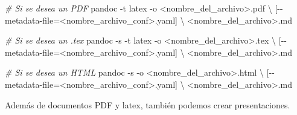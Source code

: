 \documentclass[
]{article}
\newenvironment{Shaded}{}{}
\newcommand{\AttributeTok}[1]{\textcolor[rgb]{0.49,0.56,0.16}{#1}}
\newcommand{\CommentTok}[1]{\textcolor[rgb]{0.38,0.63,0.69}{\textit{#1}}}
\newcommand{\DataTypeTok}[1]{\textcolor[rgb]{0.56,0.13,0.00}{#1}}
\newcommand{\ExtensionTok}[1]{#1}
\newcommand{\NormalTok}[1]{#1}
\newcommand{\OperatorTok}[1]{\textcolor[rgb]{0.40,0.40,0.40}{#1}}
\begin{document}
\begin{Shaded}
\begin{Highlighting}[]
\CommentTok{\# Si se desea un PDF}
\ExtensionTok{pandoc} \AttributeTok{{-}t}\NormalTok{ latex }\AttributeTok{{-}o} \OperatorTok{\textless{}}\NormalTok{nombre\_del\_archivo}\OperatorTok{\textgreater{}}\NormalTok{.pdf }\DataTypeTok{\textbackslash{}}
\NormalTok{    [{-}{-}metadata{-}file=}\OperatorTok{\textless{}}\NormalTok{nombre\_archivo\_conf}\OperatorTok{\textgreater{}}\NormalTok{.yaml] }\DataTypeTok{\textbackslash{}}
    \OperatorTok{\textless{}}\NormalTok{nombre\_del\_archivo}\OperatorTok{\textgreater{}}\NormalTok{.md}

\CommentTok{\# Si se desea un .tex  }
\ExtensionTok{pandoc} \AttributeTok{{-}s} \AttributeTok{{-}t}\NormalTok{ latex }\AttributeTok{{-}o} \OperatorTok{\textless{}}\NormalTok{nombre\_del\_archivo}\OperatorTok{\textgreater{}}\NormalTok{.tex }\DataTypeTok{\textbackslash{}}
\NormalTok{    [{-}{-}metadata{-}file=}\OperatorTok{\textless{}}\NormalTok{nombre\_archivo\_conf}\OperatorTok{\textgreater{}}\NormalTok{.yaml] }\DataTypeTok{\textbackslash{}}
    \OperatorTok{\textless{}}\NormalTok{nombre\_del\_archivo}\OperatorTok{\textgreater{}}\NormalTok{.md}
\end{Highlighting}
\end{Shaded}

\begin{Shaded}
\begin{Highlighting}[]
\CommentTok{\# Si se desea un HTML}
\ExtensionTok{pandoc} \AttributeTok{{-}s} \AttributeTok{{-}o} \OperatorTok{\textless{}}\NormalTok{nombre\_del\_archivo}\OperatorTok{\textgreater{}}\NormalTok{.html }\DataTypeTok{\textbackslash{}}
\NormalTok{    [{-}{-}metadata{-}file=}\OperatorTok{\textless{}}\NormalTok{nombre\_archivo\_conf}\OperatorTok{\textgreater{}}\NormalTok{.yaml] }\DataTypeTok{\textbackslash{}}
    \OperatorTok{\textless{}}\NormalTok{nombre\_del\_archivo}\OperatorTok{\textgreater{}}\NormalTok{.md}
\end{Highlighting}
\end{Shaded}

Además de documentos PDF y latex, también podemos crear presentaciones.
\end{document}
